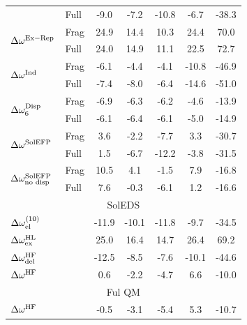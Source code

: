 \documentclass[a4paper,titlepage,twoside,fleqn,12pt]{book}
\begin{document}
\begin{refsection}
\begin{table}[t!]
\begin{tabular*}{1.0\textwidth}{@{\extracolsep{\fill} } ll ccccc }
                                               & Full &   -9.0   &  -7.2   &  -10.8   &   -6.7   & -38.3   \\
\multirow{2}{*}{$\Delta\omega^{\rm Ex-Rep}$}   & Frag &   24.9   &  14.4   &   10.3   &   24.4   &  70.0   \\
                                               & Full &   24.0   &  14.9   &   11.1   &   22.5   &  72.7   \\
\multirow{2}{*}{$\Delta\omega^{\rm Ind}$}      & Frag &   -6.1   &  -4.4   &   -4.1   &  -10.8   & -46.9   \\
                                               & Full &   -7.4   &  -8.0   &   -6.4   &  -14.6   & -51.0   \\
\multirow{2}{*}{$\Delta\omega^{\rm Disp}_6$}   & Frag &   -6.9   &  -6.3   &   -6.2   &   -4.6   & -13.9   \\
                                               & Full &   -6.1   &  -6.4   &   -6.1   &   -5.0   & -14.9   \\
\multirow{2}{*}{$\Delta\omega^{\rm SolEFP}$}   & Frag &    3.6   &  -2.2   &   -7.7   &    3.3   & -30.7   \\
                                               & Full &    1.5   &  -6.7   &  -12.2   &   -3.8   & -31.5   \\
\multirow{2}{*}{$\Delta\omega^{\rm SolEFP}_{\text{no disp}}$}   
                                               & Frag &   10.5   &   4.1   &   -1.5   &    7.9   & -16.8   \\
                                               & Full &    7.6   &  -0.3   &   -6.1   &    1.2   & -16.6   \\
\multicolumn{7}{c}{SolEDS} \\  \hline
\multicolumn{2}{l}{$\Delta\omega^{(10)}_{\rm el}$}    &  -11.9   & -10.1   &  -11.8   &   -9.7   & -34.5   \\
\multicolumn{2}{l}{$\Delta\omega^{\rm HL}_{\rm ex}$}  &   25.0   &  16.4   &   14.7   &   26.4   &  69.2   \\
\multicolumn{2}{l}{$\Delta\omega^{\rm HF}_{\rm del}$} &  -12.5   &  -8.5   &   -7.6   &  -10.1   & -44.6   \\
\multicolumn{2}{l}{$\Delta\omega^{\rm HF}$}           &    0.6   &  -2.2   &   -4.7   &    6.6   & -10.0   \\
\multicolumn{7}{c}{Ful QM} \\  \hline
\multicolumn{2}{l}{$\Delta\omega^{\rm HF}$}           &   -0.5   &  -3.1   &   -5.4   &    5.3   & -10.7   \\

\end{tabular*}
\end{table}
\end{refsection}
\end{document}
